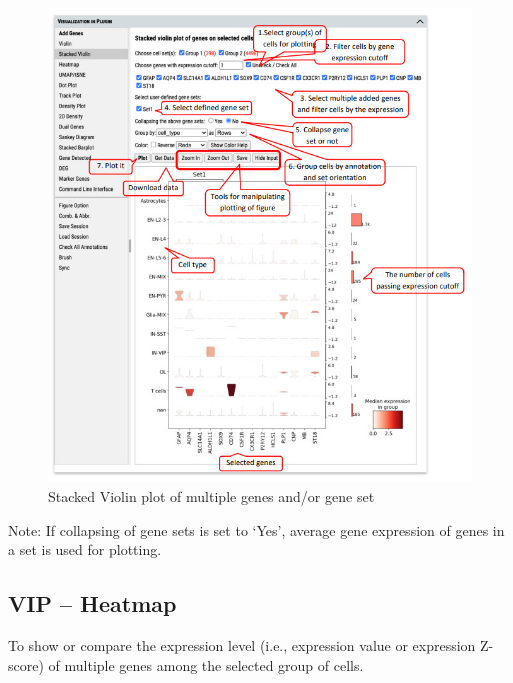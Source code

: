 \documentclass[
]{article}
\begin{document}
\begin{figure}
\centering
\includegraphics{figures/F8.jpg}
\caption{Stacked Violin plot of multiple genes and/or gene set}
\end{figure}

Note: If collapsing of gene sets is set to `Yes', average gene expression of genes in a set is used for plotting.

\hypertarget{vip-heatmap}{%
\subsection{VIP -- Heatmap}\label{vip-heatmap}}

To show or compare the expression level (i.e., expression value or expression Z-score) of multiple genes among the selected group of cells.
\end{document}
